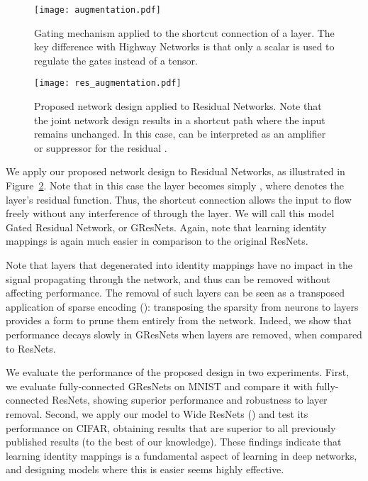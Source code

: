 \documentclass{article} \RequirePackage{amsmath,amsthm,amsfonts,amssymb}
\begin{document}
\begin{figure}[!ht]
  \centering
    \texttt{[image: augmentation.pdf]}
  \caption{Gating mechanism applied to the shortcut connection of a layer. The key difference with Highway Networks is that only a scalar  is used to regulate the gates instead of a tensor.}
\label{aug}
\end{figure}

\begin{figure}[!ht]
  \centering
    \texttt{[image: res\_augmentation.pdf]}
  \caption{Proposed network design applied to Residual Networks. Note that the joint network design results in a shortcut path where the input remains unchanged. In this case,  can be interpreted as an amplifier or suppressor for the residual .}
\label{resaug}
\end{figure}







We apply our proposed network design to Residual Networks, as illustrated in Figure~\ref{resaug}. Note that in this case the layer becomes simply , where  denotes the layer's residual function. Thus, the shortcut connection allows the input to flow freely without any interference of  through the layer. We will call this model Gated Residual Network, or GResNets. Again, note that learning identity mappings is again much easier in comparison to the original ResNets. 




Note that layers that degenerated into identity mappings have no impact in the signal propagating through the network, and thus can be removed without affecting performance. The removal of such layers can be seen as a transposed application of sparse encoding (\cite{sparse}): transposing the sparsity from neurons to layers provides a form to prune them entirely from the network. Indeed, we show that performance decays slowly in GResNets when layers are removed, when compared to ResNets.



We evaluate the performance of the proposed design in two experiments. First, we evaluate fully-connected GResNets on MNIST and compare it with fully-connected ResNets, showing superior performance and robustness to layer removal. Second, we apply our model to Wide ResNets (\cite{wide}) and test its performance on CIFAR, obtaining results that are superior to all previously published results (to the best of our knowledge). These findings indicate that learning identity mappings is a fundamental aspect of learning in deep networks, and designing models where this is easier seems highly effective.
\end{document}
